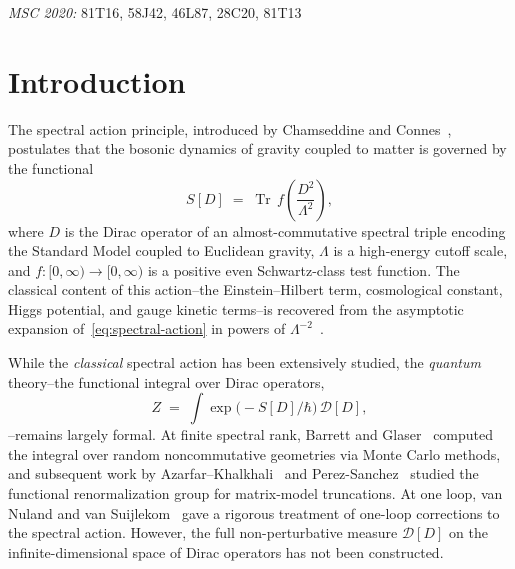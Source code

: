 \documentclass[12pt,a4paper]{article}
\theoremstyle{plain}
\theoremstyle{definition}
\theoremstyle{remark}
\newcommand{\Tr}{\operatorname{Tr}}
\newcommand{\Lam}{\Lambda}
\begin{document}
\vspace{6pt}
\noindent\textit{MSC 2020:} 81T16, 58J42, 46L87, 28C20, 81T13

\tableofcontents
\newpage

\section{Introduction}
\label{sec:intro}

The spectral action principle, introduced by Chamseddine and
Connes~\cite{CC:1996,CC:1997}, postulates that the bosonic dynamics of
gravity coupled to matter is governed by the functional
\begin{equation}\label{eq:spectral-action}
  S[D] \;=\; \Tr\, f\!\left(\frac{D^2}{\Lam^2}\right),
\end{equation}
where $D$ is the Dirac operator of an almost-commutative spectral triple
encoding the Standard Model coupled to Euclidean gravity, $\Lam$ is a
high-energy cutoff scale, and $f\colon [0,\infty)\to [0,\infty)$ is a
positive even Schwartz-class test function.  The classical content of
this action--the Einstein--Hilbert term, cosmological constant, Higgs
potential, and gauge kinetic terms--is recovered from the asymptotic
expansion of~\eqref{eq:spectral-action} in powers of
$\Lam^{-2}$~\cite{CC:1997,CCM:2007,vS:2015}.

While the \emph{classical} spectral action has been extensively studied,
the \emph{quantum} theory--the functional integral over Dirac
operators,
\begin{equation}\label{eq:naive-PI}
  Z \;=\; \int \exp\!\bigl(-S[D]/\hbar\bigr)\,\mathcal{D}[D],
\end{equation}
--remains largely formal.  At finite spectral rank, Barrett and
Glaser~\cite{BarrettGlaser:2016} computed the integral over random
noncommutative geometries via Monte Carlo methods, and subsequent work by
Azarfar--Khalkhali~\cite{AzarfarKhalkhali:2024} and
Perez-Sanchez~\cite{PerezSanchez:2021} studied the functional
renormalization group for matrix-model truncations.  At one loop, van
Nuland and van Suijlekom~\cite{vNvS:2022} gave a rigorous treatment of
one-loop corrections to the spectral action.  However, the full
non-perturbative measure $\mathcal{D}[D]$ on the infinite-dimensional
space of Dirac operators has not been constructed.
\end{document}
